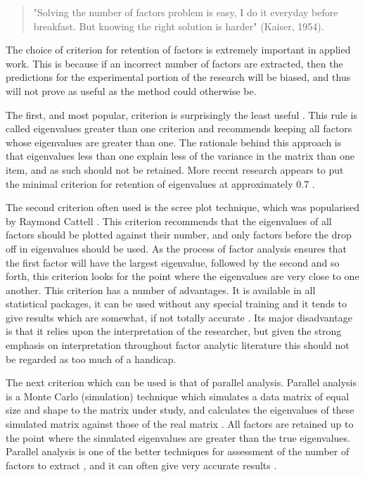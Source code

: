 \begin{quotation}
  "Solving the number of factors problem is
     easy, I do it everyday before breakfast.  But knowing the right
     solution is harder" (Kaiser, 1954).
\end{quotation}

The choice of criterion for retention of factors is extremely important in applied work. This is because if an incorrect number of factors are extracted, then the predictions for the experimental portion of the research will be biased, and thus will not prove as useful as the method could otherwise be. 

The first, and most popular, criterion is surprisingly the least useful \cite{zwick1986comparison}. This rule is called eigenvalues greater than one criterion and recommends keeping all factors whose eigenvalues are greater than one. The rationale behind this approach is that eigenvalues less than one explain less of the variance in the matrix than one item, and as such should not be retained.  More recent research appears to put the minimal criterion for retention of eigenvalues at approximately 0.7 \cite{henson2006use}. 

The second criterion often used is the scree plot technique, which was popularised by Raymond Cattell . This criterion recommends that the eigenvalues of all factors should be plotted against their number, and only factors before the drop off in eigenvalues should be used. As the process of factor analysis ensures that the first factor will have the largest eigenvalue, followed by the second and so forth, this criterion looks for the point where the eigenvalues are very close to one another.  This criterion has a number of advantages.  It is available in all statistical packages, it can be used without any special training and it tends to give results which are somewhat, if not totally accurate \cite{zwick1986comparison}.  Its major disadvantage is that it relies upon the interpretation of the researcher, but given the strong emphasis on interpretation throughout factor analytic literature this should not be regarded as too much of a handicap.

The next criterion which can be used is that of parallel analysis. Parallel analysis is a Monte Carlo (simulation)  technique which simulates a data matrix of equal size and shape to the matrix under study, and calculates the eigenvalues of these simulated matrix against those of the real matrix \cite{horn1965rationale}. All factors are retained up to the point where the simulated eigenvalues are greater than the true eigenvalues.  Parallel analysis is one of the better techniques for assessment of the number of factors to extract , and it can often give very accurate results \cite{zwick1986comparison}.

